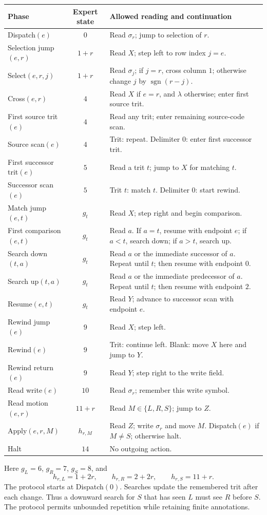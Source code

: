 \documentclass[11pt,a4paper]{article}
\newcommand{\blank}{\lambda}
\begin{document}
\begin{center}
\footnotesize\renewcommand{\arraystretch}{1.13}
\begin{tabularx}{\textwidth}{l c X}
\toprule\rowcolor{Pale}Phase & Expert state & Allowed reading and continuation\\\midrule
Dispatch$(e)$ & $0$ & Read $\sigma_r$; jump to selection of $r$.\\
Selection jump$(e,r)$ & $1+r$ & Read $X$; step left to row index $j=e$.\\
Select$(e,r,j)$ & $1+r$ & Read $\sigma_j$; if $j=r$, cross column $1$; otherwise change $j$ by $\operatorname{sgn}(r-j)$.\\
Cross$(e,r)$ & $4$ & Read $X$ if $e=r$, and $\blank$ otherwise; enter first source trit.\\
First source trit$(e)$ & $4$ & Read any trit; enter remaining source-code scan.\\
Source scan$(e)$ & $4$ & Trit: repeat. Delimiter $0$: enter first successor trit.\\
First successor trit$(e)$ & $5$ & Read a trit $t$; jump to $X$ for matching $t$.\\
Successor scan$(e)$ & $5$ & Trit $t$: match $t$. Delimiter $0$: start rewind.\\
Match jump$(e,t)$ & $g_t$ & Read $X$; step right and begin comparison.\\
First comparison$(e,t)$ & $g_t$ & Read $a$. If $a=t$, resume with endpoint $e$; if $a<t$, search down; if $a>t$, search up.\\
Search down$(t,a)$ & $g_t$ & Read $a$ or the immediate successor of $a$. Repeat until $t$; then resume with endpoint $0$.\\
Search up$(t,a)$ & $g_t$ & Read $a$ or the immediate predecessor of $a$. Repeat until $t$; then resume with endpoint $2$.\\
Resume$(e,t)$ & $g_t$ & Read $Y$; advance to successor scan with endpoint $e$.\\
Rewind jump$(e)$ & $9$ & Read $X$; step left.\\
Rewind$(e)$ & $9$ & Trit: continue left. Blank: move $X$ here and jump to $Y$.\\
Rewind return$(e)$ & $9$ & Read $Y$; step right to the write field.\\
Read write$(e)$ & $10$ & Read $\sigma_r$; remember this write symbol.\\
Read motion$(e,r)$ & $11+r$ & Read $M\in\{L,R,S\}$; jump to $Z$.\\
Apply$(e,r,M)$ & $h_{r,M}$ & Read $Z$; write $\sigma_r$ and move $M$. Dispatch$(e)$ if $M\ne S$; otherwise halt.\\
Halt & $14$ & No outgoing action.\\
\bottomrule
\end{tabularx}
\end{center}
Here $g_L=6$, $g_R=7$, $g_S=8$, and
\[
h_{r,L}=1+2r,\qquad h_{r,R}=2+2r,\qquad h_{r,S}=11+r.
\]
The protocol starts at Dispatch$(0)$. Searches update the remembered trit
after each change. Thus a downward search for $S$ that has seen $L$ must see
$R$ before $S$. The protocol permits unbounded repetition while retaining finite annotations.
\end{document}

